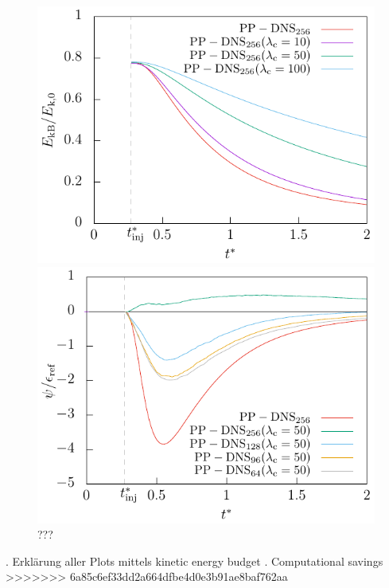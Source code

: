 \documentclass[11pt,a4paper,openany,oneside,parskip=half*]{article}
\begin{document}
\begin{figure}[h]
    \centering
    \begin{minipage}{.5\textwidth}
         \centering
        \includegraphics[width=\linewidth]{./Abbildungen/256/particlekineticenergy_time.pdf}
        \caption{???}
        \label{particlekineticenergy_time_256}
    \end{minipage}%
    \begin{minipage}{0.5\textwidth}
        \centering
        \includegraphics[width=\linewidth]{./Abbildungen/vergleich_coupling_time.pdf}
        \caption{???}
        \label{vergleich_coupling_time_256}
    \end{minipage}
\end{figure}
. Erklärung aller Plots mittels kinetic energy budget
\newline
{}. Computational savings
>>>>>>> 6a85c6ef33dd2a664dfbe4d0e3b91ae8baf762aa
\pagebreak
\end{document}
